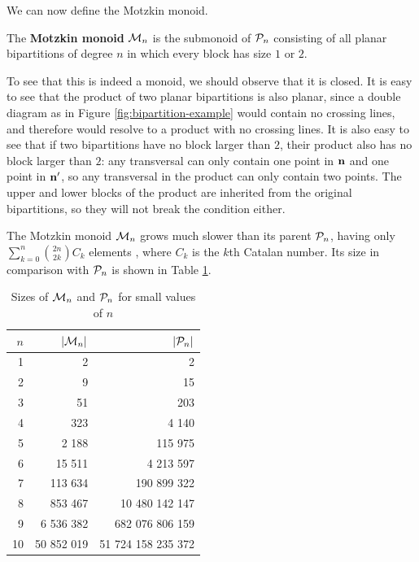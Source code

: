 We can now define the Motzkin monoid.

\begin{definition}
  \label{def:motzkin}
  The \textbf{Motzkin monoid} $\mathcal{M}_n$ is the submonoid of $\mathcal{P}_n$ consisting
  of all planar bipartitions of degree $n$ in which every block has size $1$ or
  $2$.
\end{definition}

To see that this is indeed a monoid, we should observe that it is closed.  It is
easy to see that the product of two planar bipartitions is also planar, since a
double diagram as in Figure \ref{fig:bipartition-example} would contain no
crossing lines, and therefore would resolve to a product with no crossing lines.
It is also easy to see that if two bipartitions have no block larger than $2$,
their product also has no block larger than $2$: any transversal can only
contain one point in $\mathbf{n}$ and one point in $\mathbf{n}'$, so any transversal in the
product can only contain two points.  The upper and lower blocks of the product
are inherited from the original bipartitions, so they will not break the
condition either.

The Motzkin monoid $\mathcal{M}_n$ grows much slower than its parent $\mathcal{P}_n$, having
only $\sum_{k=0}^n \binom{2n}{2k}C_k$ elements
, where $C_k$ is the $k$th
Catalan number.  Its size in comparison with $\mathcal{P}_n$ is shown in Table
\ref{tab:mn-size}.

\begin{table}[h]
  \centering
  \renewcommand\arraystretch{1.0}
  \begin{tabular}{| r | r | r |}
    \hline
    $n$ & $|\mathcal{M}_n|$ & $|\mathcal{P}_n|$ \\
    \hline
     1 &           2 &                  2 \\
     2 &           9 &                 15 \\
     3 &          51 &                203 \\
     4 &         323 &              4 140 \\
     5 &       2 188 &            115 975 \\
     6 &      15 511 &          4 213 597 \\
     7 &     113 634 &        190 899 322 \\
     8 &     853 467 &     10 480 142 147 \\
     9 &   6 536 382 &    682 076 806 159 \\
    10 &  50 852 019 & 51 724 158 235 372 \\
    \hline
  \end{tabular}
  \renewcommand\arraystretch{0.7}
  \caption{Sizes of $\mathcal{M}_n$ and $\mathcal{P}_n$ for small values of $n$}
  \label{tab:mn-size}
\end{table}

